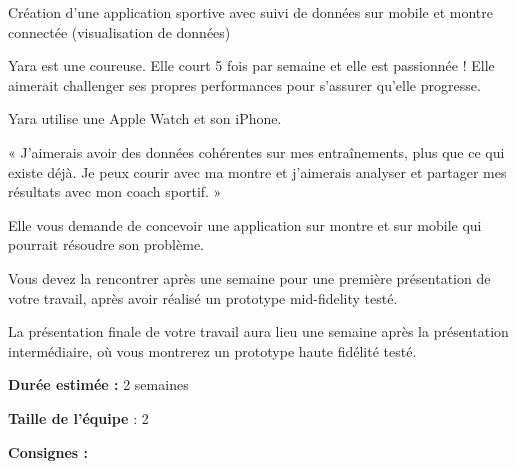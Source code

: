 \makeheaderfiles

Création d'une application sportive avec suivi de données sur mobile et montre connectée (visualisation de données)

Yara est une coureuse. Elle court 5 fois par semaine et elle est passionnée ! Elle aimerait challenger ses propres performances pour s'assurer qu'elle progresse.

Yara utilise une Apple Watch et son iPhone.

« J'aimerais avoir des données cohérentes sur mes entraînements, plus que ce qui existe déjà. Je peux courir avec ma montre et j'aimerais analyser et partager mes résultats avec mon coach sportif. »

Elle vous demande de concevoir une application sur montre et sur mobile qui pourrait résoudre son problème.

Vous devez la rencontrer après une semaine pour une première présentation de votre travail, après avoir réalisé un prototype mid-fidelity testé.

La présentation finale de votre travail aura lieu une semaine après la présentation intermédiaire, où vous montrerez un prototype haute fidélité testé.

\textbf{Durée estimée :} 2 semaines

\textbf{Taille de l'équipe} : 2

\textbf{Consignes :}

